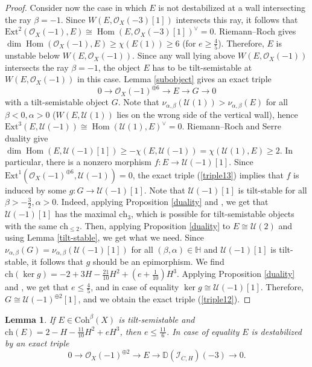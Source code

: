 \documentclass{amsart}
\DeclareMathOperator{\Hom}{Hom}
\newtheorem{lemma}[theorem]{Lemma}
\begin{document}
\begin{proof}
		Consider now the case in which $E$ is not destabilized at a wall intersecting the ray $\beta=-1$. Since $W(E,\mathcal O_X(-3)[1])$ intersects this ray, it follows that $\mathrm{Ext}^2(\mathcal O_X(-1),E)\cong\Hom(E,\mathcal O_X(-3)[1])^\vee=0$. Riemann--Roch gives $\dim \Hom(\mathcal O_X(-1),E)\ge\chi(E(1))\ge 6$ (for $e\ge\frac 45$). Therefore, $E$ is unstable below $W(E,\mathcal O_X(-1))$. Since any wall lying above $W(E,\mathcal O_X(-1))$ intersects the ray $\beta=-1$, the object $E$ has to be tilt-semistable at $W(E,\mathcal O_X(-1))$ in this case. Lemma \ref{subobject} gives an exact triple
		\begin{equation}\label{triple13}0\to\mathcal O_X(-1)^{\oplus 6}\to E\to G\to 0
		\end{equation}
		with a tilt-semistable object $G$. Note that $\nu_{\alpha,\beta}(\mathcal U(1))>\nu_{\alpha,\beta}(E)$ for all $\beta<0,\alpha>0$ ($W(E,\mathcal U(1))$ lies on the wrong side of the vertical wall), hence $\mathrm{Ext}^3(E,\mathcal U(-1))\cong\Hom(\mathcal U(1),E)^\vee=0$. Riemann--Roch and Serre duality give $\dim \Hom(E,\mathcal U(-1)[1])\ge-\chi(E,\mathcal U(-1))=\chi(\mathcal U(1),E)\ge 2$. In particular, there is a nonzero morphism $f:E\to\mathcal U(-1)[1]$. Since $\mathrm{Ext}^1(\mathcal O_X(-1)^{\oplus 6},\mathcal U(-1))=0$, the exact triple (\ref{triple13}) implies that $f$ is induced by some $g:G\to\mathcal U(-1)[1]$. Note that $\mathcal U(-1)[1]$ is tilt-stable for all $\beta>-\frac 32,\alpha>0$. Indeed, applying Proposition \ref{duality} and \cite[Lemma 3.6]{Vass}, we get that $\mathcal U(-1)[1]$ has the maximal $\mathrm{ch}_3$, which is possible for tilt-semistable objects with the same $\mathrm{ch}_{\le 2}$. Then, applying Proposition \ref{duality} to $E\cong\mathcal U(2)$ and using Lemma \ref{tilt-stable}, we get what we need. Since $\nu_{\alpha,\beta}(G)=\nu_{\alpha,\beta}(\mathcal U(-1)[1])$ for all $(\beta,\alpha)\in\mathbb H$ and $\mathcal U(-1)[1]$ is tilt-stable, it follows that $g$ should be an epimorphism. We find $\mathrm{ch}(\ker g)=-2+3H-\frac{21}{10}H^2+(e+\frac{1}{10})H^3$. Applying Proposition \ref{duality} and \cite[Lemma 3.6]{Vass}, we get that $e\le\frac 45$, and in case of equality $\ker g\cong\mathcal U(-1)[1]$. Therefore, $G\cong\mathcal U(-1)^{\oplus 2}[1]$, and we obtain the exact triple (\ref{triple12}).
	\end{proof}
	
	\begin{lemma}\label{2 -1 -11/10} If $E\in\mathrm{Coh}^\beta(X)$ is tilt-semistable and $\mathrm{ch}(E)=2-H-\frac{11}{10}H^2+eH^3$, then $e\le\frac{11}{6}$. In case of equality $E$ is destabilized by an exact triple
		\begin{equation}\label{triple14}0\to\mathcal O_X(-1)^{\oplus 2}\to E\to \mathbb D(\mathcal I_{C,H})(-3)\to 0.
		\end{equation}
	\end{lemma}
	
\end{document}
